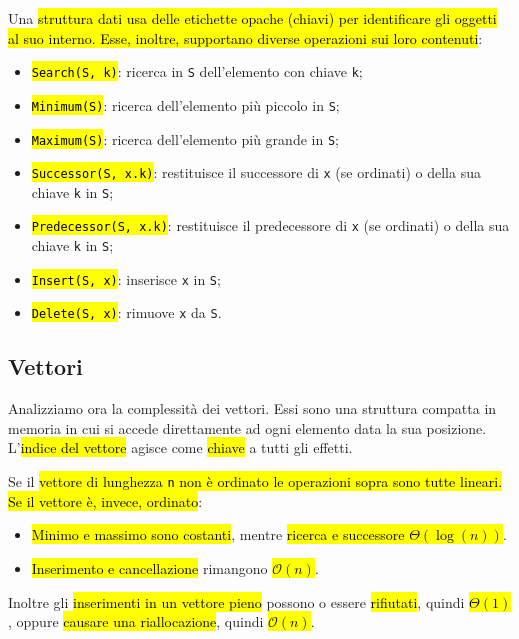 \documentclass[a4paper,11pt,oneside]{article}
\theoremstyle{plain}
\theoremstyle{definition}
\theoremstyle{remark}
\begin{document}
Una \hl{struttura dati usa delle etichette opache (chiavi) per identificare gli
oggetti al suo interno. Esse, inoltre, supportano diverse operazioni sui loro
contenuti}:

\begin{itemize}
  \item \hl{\texttt{Search(S, k)}}: ricerca in \texttt{S} dell'elemento con chiave
    \texttt{k};
  \item \hl{\texttt{Minimum(S)}}: ricerca dell'elemento più piccolo in \texttt{S};
  \item \hl{\texttt{Maximum(S)}}: ricerca dell'elemento più grande in \texttt{S};
  \item \hl{\texttt{Successor(S, x.k)}}: restituisce il successore di \texttt{x} (se
    ordinati) o della sua chiave \texttt{k} in \texttt{S};
  \item \hl{\texttt{Predecessor(S, x.k)}}: restituisce il predecessore di \texttt{x}
    (se ordinati) o della sua chiave \texttt{k} in \texttt{S};
  \item \hl{\texttt{Insert(S, x)}}: inserisce \texttt{x} in \texttt{S};
  \item \hl{\texttt{Delete(S, x)}}: rimuove \texttt{x} da \texttt{S}.
\end{itemize}

\subsection{Vettori}\label{sec:array}

Analizziamo ora la complessità dei vettori. Essi sono una struttura compatta in
memoria in cui si accede direttamente ad ogni elemento data la sua posizione.
L'\hl{indice del vettore} agisce come \hl{chiave} a tutti gli effetti.

Se il \hl{vettore di lunghezza \texttt{n} non è ordinato le operazioni sopra
sono tutte lineari. Se il vettore è, invece, ordinato}:

\begin{itemize}
  \item \hl{Minimo e massimo sono costanti}, mentre \hl{ricerca e successore
    $\Theta(\log(n))$}.
  \item \hl{Inserimento e cancellazione} rimangono \hl{$\mathcal{O}(n)$}.
\end{itemize}

Inoltre gli \hl{inserimenti in un vettore pieno} possono o essere
\hl{rifiutati}, quindi \hl{$\Theta(1)$}, oppure \hl{causare una riallocazione},
quindi \hl{$\mathcal{O}(n)$}.
\end{document}
